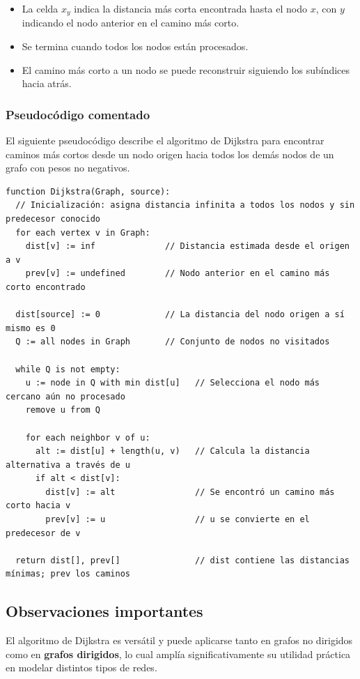 \begin{itemize}
  \item La celda $x_y$ indica la distancia más corta encontrada hasta el nodo $x$, con $y$ indicando el nodo anterior en el camino más corto.
  \item Se termina cuando todos los nodos están procesados.
  \item El camino más corto a un nodo se puede reconstruir siguiendo los subíndices hacia atrás.
\end{itemize}

\subsubsection{Pseudocódigo comentado}
El siguiente pseudocódigo describe el algoritmo de Dijkstra para encontrar caminos más cortos desde un nodo origen hacia todos los demás nodos de un grafo con pesos no negativos. 

\begin{verbatim}
function Dijkstra(Graph, source):
  // Inicialización: asigna distancia infinita a todos los nodos y sin predecesor conocido
  for each vertex v in Graph:
    dist[v] := inf              // Distancia estimada desde el origen a v
    prev[v] := undefined        // Nodo anterior en el camino más corto encontrado

  dist[source] := 0             // La distancia del nodo origen a sí mismo es 0
  Q := all nodes in Graph       // Conjunto de nodos no visitados

  while Q is not empty:
    u := node in Q with min dist[u]   // Selecciona el nodo más cercano aún no procesado
    remove u from Q
    
    for each neighbor v of u:
      alt := dist[u] + length(u, v)   // Calcula la distancia alternativa a través de u
      if alt < dist[v]:
        dist[v] := alt                // Se encontró un camino más corto hacia v
        prev[v] := u                  // u se convierte en el predecesor de v

  return dist[], prev[]               // dist contiene las distancias mínimas; prev los caminos
\end{verbatim}


\subsection{Observaciones importantes}
El algoritmo de Dijkstra es versátil y puede aplicarse tanto en grafos no dirigidos como en \textbf{grafos dirigidos}, lo cual amplía significativamente su utilidad práctica en modelar distintos tipos de redes. 

